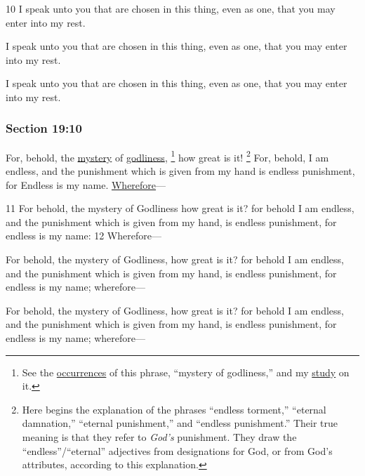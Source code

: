 		\begin{framed}
		\scriptsize
			\begin{compactdesc}
				\item[JSP] 10 I speak unto you that are chosen in this thing, even as one, that you may enter into my rest.
				\item[RB1] [\textit{missing}]
				\item[DC 1835] I speak unto you that are chosen in this thing, even as one, that you may enter into my rest. 
				\item[DC 1844] I speak unto you that are chosen in this thing, even as one, that you may enter into my rest. 
			\end{compactdesc}
		\end{framed}

	\subsubsection{Section 19:10} %
		\label{DC19-10}

		For, behold, the \hyperref[MYSTERY]{mystery} of \hyperref[GODLINESS]{godliness},%
			\footnote{%
				\label{DC19-10-mystery}%
				See the \hyperref[GODLINESS-PHRASES]{occurrences} of this phrase, ``mystery of godliness,'' and my \hyperref[GODLINESS-mystery]{study} on it.
				}
		how great is it!
			\footnote{%
				Here begins the explanation of the phrases ``endless torment,'' ``eternal damnation,'' ``eternal punishment,'' and ``endless punishment.'' Their true meaning is that they refer to \textit{God's} punishment. They draw the ``endless''/``eternal'' adjectives from designations for God, or from God's attributes, according to this explanation.
				}%
		For, behold, I am endless, and the punishment which is given from my hand is endless punishment, for Endless is my name. \hyperref[WHEREFORE]{Wherefore}---

		\begin{framed}
		\scriptsize
			\begin{compactdesc}
				\item[JSP] 11 For behold, the mystery of Godliness how great is it? for behold I am endless, and the punishment which is given from my hand, is endless punishment, for endless is my name: 12 Wherefore---
				\item[RB1] [\textit{missing}]
				\item[DC 1835] For behold, the mystery of Godliness, how great is it? for behold I am endless, and the punishment which is given from my hand, is endless punishment, for endless is my name; wherefore---
				\item[DC 1844] For behold, the mystery of Godliness, how great is it? for behold I am endless, and the punishment which is given from my hand, is endless punishment, for endless is my name; wherefore---
			\end{compactdesc}
		\end{framed}

